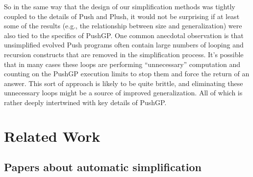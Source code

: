 So in the same way that the design of our simplification methods was
tightly coupled to the details of Push and Plush, it would not be surprising
if at least some of the results (e.g., the relationship between size and
generalization) were also tied to the specifics of PushGP. One common
anecdotal observation is that unsimplified evolved Push programs often
contain large numbers of looping and recursion constructs that are removed
in the simplification process. It's possible that in many cases these loops
are performing ``unnecessary'' computation and counting on the PushGP
execution limits to stop them and force the return of an answer. This sort
of approach is likely to be quite brittle, and eliminating these unnecessary
loops might be a source of improved generalization. All of which is rather
deeply intertwined with key details of PushGP.


\section{Related Work}
\label{sec:related}



\subsection{Papers about automatic simplification}

